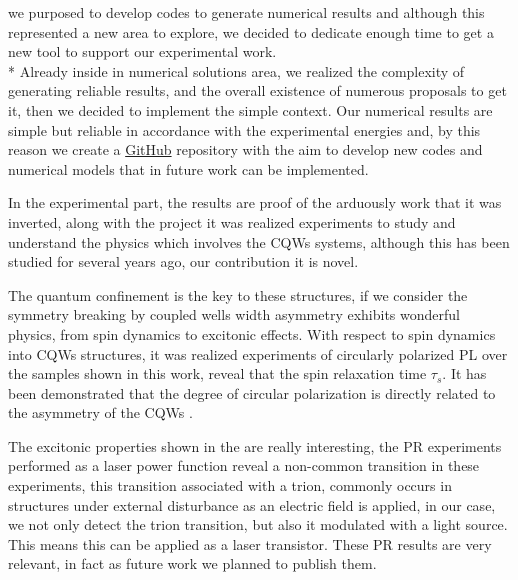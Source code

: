 we purposed to develop codes to generate numerical results and although this represented a new area to explore, we decided to dedicate enough time to get a new tool to support
our experimental work.\\*
Already inside in numerical solutions area, we realized the complexity of generating reliable
results, and the overall existence of numerous proposals to get it, then we decided to implement the simple context. Our numerical results are simple but reliable in accordance with the experimental energies and, by this reason we create a  \href{https://github.com/lflmgroup}{GitHub} repository \cite{lflmgroup} with the aim to develop new codes and numerical models that in future work can be implemented.

In the experimental part, the results are proof of the arduously work that it was inverted, along with the project it was realized experiments to study and understand the physics which involves the \gls{CQWs} systems, although this has been studied for several years ago, our contribution it is novel.

The quantum confinement is the key to these structures, if we consider the symmetry breaking by coupled wells width asymmetry exhibits wonderful physics, from spin dynamics to excitonic effects. With respect to spin dynamics into \gls{CQWs} structures, it was realized
experiments of circularly polarized PL over the samples shown in this work, reveal that the
spin relaxation time $\tau_s$. It has been demonstrated that the degree of circular polarization is directly related to the asymmetry of the \gls{CQWs} \cite{bravo2022photoluminiscence}.

The excitonic properties shown in the  are really interesting, the \gls{PR}
experiments performed as a laser power function reveal a non-common transition in these experiments, this transition associated with a trion, commonly occurs in structures under external disturbance as an electric field is applied, in our case, we not only detect the trion transition, but also it modulated with a light source. This means this can be applied as a laser transistor. These \gls{PR} results are very relevant, in fact as future work we planned
to publish them.\\

